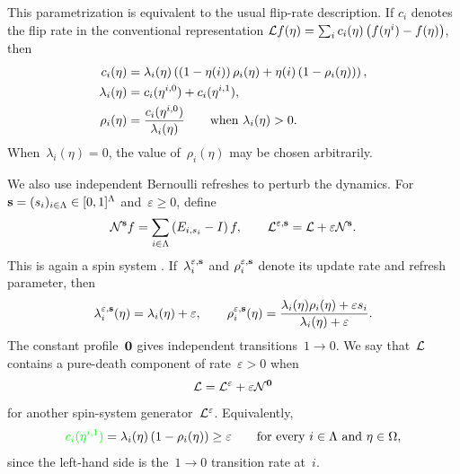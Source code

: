  This parametrization is equivalent to the usual flip-rate description. If
$c_i$ denotes the flip rate in the conventional representation
$\mathcal{L} f(\eta)=\sum_i c_i(\eta)\left(f(\eta^i)-f(\eta)\right)$, then 
\begin{align*}
c_i(\eta)
&=
\lambda_i(\eta)
\left(
\left(1-\eta(i)\right)\rho_i(\eta)
+
\eta(i)\left(1-\rho_i(\eta)\right)
\right),
\\
\lambda_i(\eta)
&=
c_i(\eta^{i,0})+c_i(\eta^{i,1}),
\\
\rho_i(\eta)
&=
\frac{c_i(\eta^{i,0})}{\lambda_i(\eta)}
\qquad\text{when }\lambda_i(\eta)>0.
\end{align*}
When~$\lambda_i(\eta)=0$, the value of~$\rho_i(\eta)$ may be chosen
arbitrarily.

We also use independent Bernoulli refreshes to perturb the dynamics. For
$\mathbf{s}=(s_i)_{i\in\Lambda}\in[0,1]^\Lambda$ and~$\varepsilon\geq0$, define
\begin{equation*}
\mathcal{N}^{\mathbf{s}}f
=
\sum_{i\in\Lambda}\left(E_{i,s_i}-I\right)f,
\qquad
\mathcal{L}^{\varepsilon,\mathbf{s}}
=
\mathcal{L}+\varepsilon\mathcal{N}^{\mathbf{s}}.
\end{equation*}
This is again a spin system . If~$\lambda_i^{\varepsilon,\mathbf{s}}$ and
$\rho_i^{\varepsilon,\mathbf{s}}$ denote its update rate and refresh parameter, then
\begin{equation*}
\lambda_i^{\varepsilon,\mathbf{s}}(\eta)
=
\lambda_i(\eta)+\varepsilon, \qquad \rho_i^{\varepsilon,\mathbf{s}}(\eta)
=
\frac{\lambda_i(\eta)\rho_i(\eta)+\varepsilon s_i}
{\lambda_i(\eta)+\varepsilon}.
\end{equation*}
The constant profile~$\mathbf{0}$ gives independent transitions~$1\to0$. We say
that~$\mathcal{L}$ contains a pure-death component of rate~$\varepsilon>0$ when
\begin{equation}
\label{eq:pure-death-component}
\mathcal{L}=\mathcal{L}^\varepsilon+\varepsilon\mathcal{N}^{\mathbf{0}}
\end{equation}
for another spin-system generator~$\mathcal{L}^\varepsilon$.  
 Equivalently, 
\begin{equation*}
\textcolor{green}{c_i(\eta^{i,1})} = \lambda_i(\eta)\left(1-\rho_i(\eta)\right)
\geq\varepsilon
\qquad\text{for every }i\in\Lambda\text{ and }\eta\in\Omega,
\end{equation*}
since the left-hand side is the~$1\to0$ transition rate at~$i$.


